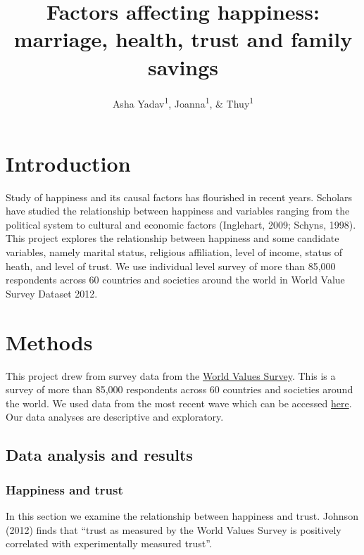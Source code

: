 \documentclass[man, fleqn, noextraspace,floatsintext]{apa6}
\title{Factors affecting happiness: marriage, health, trust and family savings}
\author{Asha Yadav\textsuperscript{1}, Joanna\textsuperscript{1}, \& Thuy\textsuperscript{1}}
\date{}
\affiliation{
\vspace{0.5cm}
\textsuperscript{1} University of Oregon}
\begin{document}
\maketitle

\hypertarget{introduction}{%
\section{Introduction}\label{introduction}}

Study of happiness and its causal factors has flourished in recent years. Scholars have studied the relationship between happiness and variables ranging from the political system to cultural and economic factors (Inglehart, 2009; Schyns, 1998). This project explores the relationship between happiness and some candidate variables, namely marital status, religious affiliation, level of income, status of heath, and level of trust. We use individual level survey of more than 85,000 respondents across 60 countries and societies around the world in World Value Survey Dataset 2012.

\hypertarget{methods}{%
\section{Methods}\label{methods}}

This project drew from survey data from the \href{http://www.worldvaluessurvey.org/WVSContents.jsp}{World Values Survey}. This is a survey of more than 85,000 respondents across 60 countries and societies around the world. We used data from the most recent wave which can be accessed \href{http://www.worldvaluessurvey.org/WVSDocumentationWV6.jsp}{here}. Our data analyses are descriptive and exploratory.

\hypertarget{data-analysis-and-results}{%
\subsection{Data analysis and results}\label{data-analysis-and-results}}

\hypertarget{happiness-and-trust}{%
\subsubsection{Happiness and trust}\label{happiness-and-trust}}

In this section we examine the relationship between happiness and trust. Johnson (2012) finds that \enquote{trust as measured by the World Values Survey is positively correlated with experimentally measured trust}.
\end{document}

